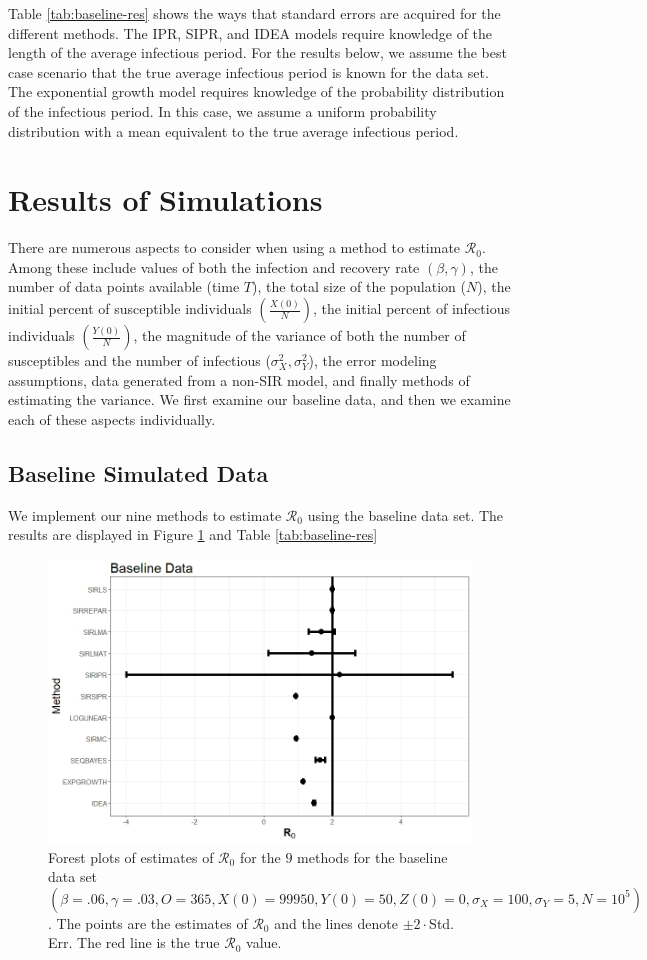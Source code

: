 \documentclass[12pt]{article}
\newcommand{\xxsir}{\ensuremath{9} } %
\newcommand{\wxxsir}{nine } %
\newcommand{\rr}{\ensuremath{\mathcal{R}_0}}
\begin{document}
Table \ref{tab:baseline-res} shows the ways that standard errors are acquired for the different methods. The IPR, SIPR, and IDEA models require knowledge of the length of the average infectious period. For the results below, we assume the best case scenario that the true average infectious period is known for the data set. The exponential growth model requires knowledge of the probability distribution of the infectious period. In this case, we assume a uniform probability distribution with a mean equivalent to the true average infectious period.

\section{Results of Simulations}\label{sec:results}
There are numerous aspects to consider when using a method to estimate $\rr$.  Among these include values of both the infection and recovery rate $(\beta, \gamma)$, the number of data points available (time $T$), the total size of the population ($N$), the initial percent of susceptible individuals $\left (\frac{X(0)}{N}\right)$, the initial percent of infectious individuals $\left (\frac{Y(0)}{N}\right )$, the magnitude of the variance of both the number of susceptibles and the number of infectious ($\sigma_X^2, \sigma_Y^2$), the error modeling assumptions, data generated from a non-SIR model, and finally methods of estimating the variance.  We first examine our baseline data, and then we examine each of these aspects individually.

\subsection{Baseline Simulated Data}\label{sec:res-base}
We implement our \wxxsir methods to estimate $\rr$ using the baseline data set.  The results are displayed in Figure \ref{fig:baseline-res} and Table \ref{tab:baseline-res}
\begin{figure}[H]
  \centering
  \includegraphics[scale=0.5]{images/BaseBase.jpeg}
  \caption{Forest plots of estimates of $\rr$ for the \xxsir methods for the baseline data set $(\beta=.06, \gamma=.03, O=365, X(0)=99950, Y(0)=50, Z(0)=0, \sigma_X=100, \sigma_Y=5, N=10^5)$.  The points are the estimates of $\rr$ and the lines denote $\pm 2\cdot $Std. Err.  The red line is the true $\rr$ value.}\label{fig:baseline-res}
  \end{figure}
\end{document}

